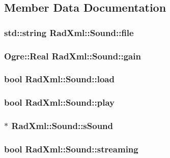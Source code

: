 \subsection{Member Data Documentation}
\hypertarget{class_rad_xml_1_1_sound_a6bd53bf01b87b3a40e1c85f00459dbc3}{
\subsubsection[{file}]{\setlength{\rightskip}{0pt plus 5cm}std\-::string Rad\-Xml\-::\-Sound\-::file}}\label{class_rad_xml_1_1_sound_a6bd53bf01b87b3a40e1c85f00459dbc3}
\hypertarget{class_rad_xml_1_1_sound_ac080c5dc6c8ed7960d1abed7d22eec60}{
\subsubsection[{gain}]{\setlength{\rightskip}{0pt plus 5cm}Ogre\-::\-Real Rad\-Xml\-::\-Sound\-::gain}}\label{class_rad_xml_1_1_sound_ac080c5dc6c8ed7960d1abed7d22eec60}
\hypertarget{class_rad_xml_1_1_sound_a1c7b24473814d28f18119567d7a30da1}{
\subsubsection[{load}]{\setlength{\rightskip}{0pt plus 5cm}bool Rad\-Xml\-::\-Sound\-::load}}\label{class_rad_xml_1_1_sound_a1c7b24473814d28f18119567d7a30da1}
\hypertarget{class_rad_xml_1_1_sound_a19342cd8f3f12330c4615e9d24b99aa1}{
\subsubsection[{play}]{\setlength{\rightskip}{0pt plus 5cm}bool Rad\-Xml\-::\-Sound\-::play}}\label{class_rad_xml_1_1_sound_a19342cd8f3f12330c4615e9d24b99aa1}
\hypertarget{class_rad_xml_1_1_sound_ab5e205180ba7a0d28bfc1b9df33414e4}{
\subsubsection[{s\-Sound}]{$\ast$ Rad\-Xml\-::\-Sound\-::s\-Sound}}\label{class_rad_xml_1_1_sound_ab5e205180ba7a0d28bfc1b9df33414e4}
\hypertarget{class_rad_xml_1_1_sound_add80004a05fdcfa42f3b3af1f057f8d2}{
\subsubsection[{streaming}]{\setlength{\rightskip}{0pt plus 5cm}bool Rad\-Xml\-::\-Sound\-::streaming}}\label{class_rad_xml_1_1_sound_add80004a05fdcfa42f3b3af1f057f8d2}


